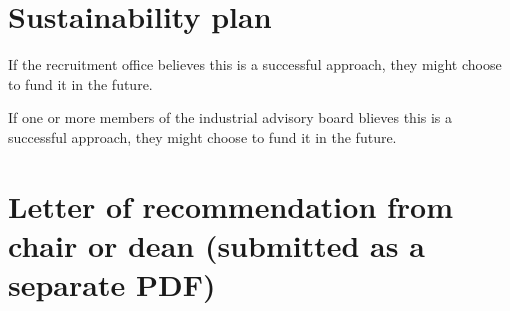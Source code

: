 \documentclass[]{article}
\begin{document}
	\section{Sustainability plan}
	If the recruitment office believes this is a successful approach, they might choose to fund it in the future.
	
	If one or more members of the industrial advisory board blieves this is a successful approach, they might choose to fund it in the future.
	
	\section{Letter of recommendation from chair or dean (submitted as a separate PDF)}
\end{document}
